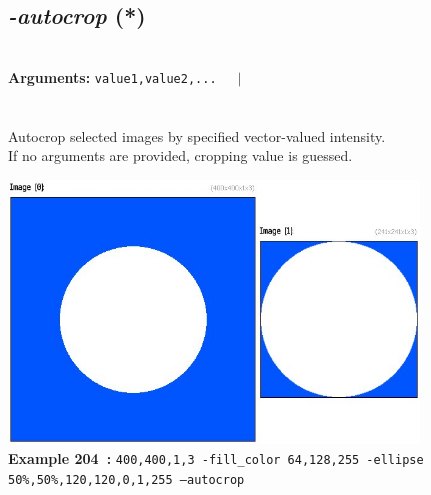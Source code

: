 \documentclass[a4paper,11pt,twoside]{book}
\begin{document}
\subsection{\emph{-autocrop} (*)}\vspace*{-0.5em}
~\\\textbf{Arguments: } 
{\small \texttt{value1,value2,...}}~~~$|$\\
\\~\\
Autocrop selected images by specified vector-valued intensity.
~\\If no arguments are provided, cropping value is guessed.
\begin{center}\includegraphics[keepaspectratio=true,height=7cm,width=\textwidth]{img/gmic_def204.jpg}\\
{\footnotesize \textbf{Example 204~:} \texttt{400,400,1,3 -fill\_color 64,128,255 -ellipse 50\%,50\%,120,120,0,1,255 --autocrop}}
\end{center}
\end{document}
